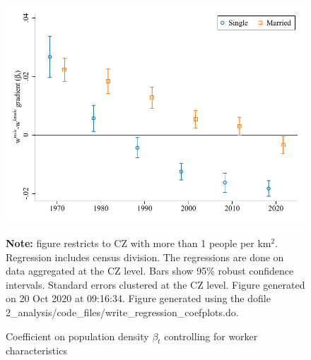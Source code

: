 \begin{figure}[!h]
\centering
\caption{Coefficient on population density $ \beta_t $ controlling for worker characteristics}
\includegraphics[width=.6\textwidth]{../2_analysis/output/figures/by_married_czone_l_czone_pop_full_time}
\par \begin{minipage}[h]{\textwidth}{\tiny\textbf{Note:} figure restricts to CZ with more than 1 people per km$^2$. Regression includes census division. The regressions are done on data aggregated at the CZ level. Bars show 95\% robust confidence intervals. Standard errors clustered at the CZ level. Figure generated on 20 Oct 2020 at 09:16:34. Figure generated using the dofile 2\_analysis/code\_files/write\_regression\_coefplots.do.}\end{minipage}
\end{figure}
